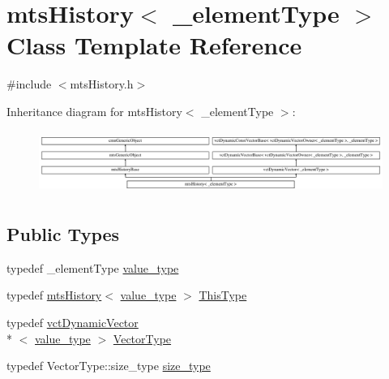 \hypertarget{classmts_history}{\section{mts\-History$<$ \-\_\-element\-Type $>$ Class Template Reference}
\label{classmts_history}
}


{\ttfamily \#include $<$mts\-History.\-h$>$}

Inheritance diagram for mts\-History$<$ \-\_\-element\-Type $>$\-:\begin{figure}[H]
\begin{center}
\leavevmode
\includegraphics[height=2.077922cm]{db/db7/classmts_history}
\end{center}
\end{figure}
\subsection*{Public Types}
\begin{DoxyCompactItemize}
\item 
typedef \-\_\-element\-Type \hyperlink{classmts_history_a83c4704404e2b71933b53c184bf72e8f}{value\-\_\-type}
\item 
typedef \hyperlink{classmts_history}{mts\-History}$<$ \hyperlink{classmts_history_a83c4704404e2b71933b53c184bf72e8f}{value\-\_\-type} $>$ \hyperlink{classmts_history_aacbd58dfe7cfbae30858ab99557ee181}{This\-Type}
\item 
typedef \hyperlink{classvct_dynamic_vector}{vct\-Dynamic\-Vector}\\*
$<$ \hyperlink{classmts_history_a83c4704404e2b71933b53c184bf72e8f}{value\-\_\-type} $>$ \hyperlink{classmts_history_a7ccb818e85025368eb6ccdb5423453a3}{Vector\-Type}
\item 
typedef Vector\-Type\-::size\-\_\-type \hyperlink{classmts_history_aca985b1dbd39cc61816674edc9aee0cc}{size\-\_\-type}
\end{DoxyCompactItemize}
